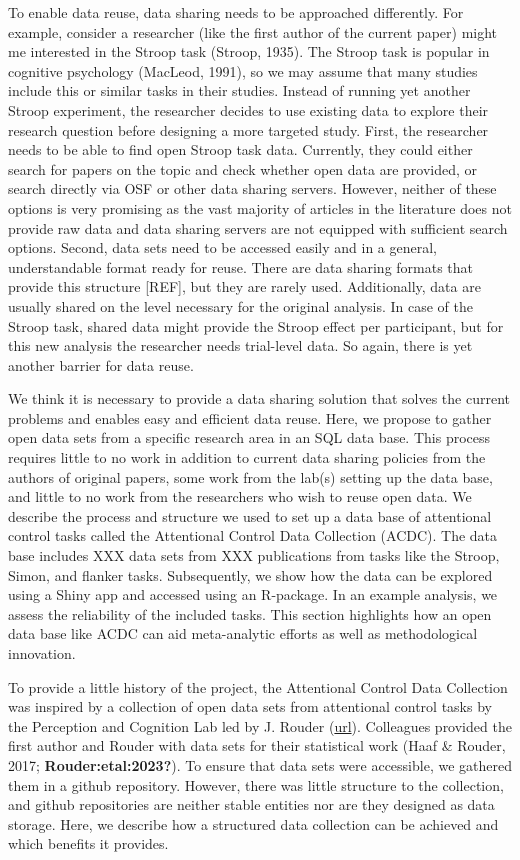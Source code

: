 \documentclass[
  man]{apa6}
\begin{document}
To enable data reuse, data sharing needs to be approached differently. For example, consider a researcher (like the first author of the current paper) might me interested in the Stroop task (Stroop, 1935). The Stroop task is popular in cognitive psychology (MacLeod, 1991), so we may assume that many studies include this or similar tasks in their studies. Instead of running yet another Stroop experiment, the researcher decides to use existing data to explore their research question before designing a more targeted study. First, the researcher needs to be able to find open Stroop task data. Currently, they could either search for papers on the topic and check whether open data are provided, or search directly via OSF or other data sharing servers. However, neither of these options is very promising as the vast majority of articles in the literature does not provide raw data and data sharing servers are not equipped with sufficient search options. Second, data sets need to be accessed easily and in a general, understandable format ready for reuse. There are data sharing formats that provide this structure {[}REF{]}, but they are rarely used. Additionally, data are usually shared on the level necessary for the original analysis. In case of the Stroop task, shared data might provide the Stroop effect per participant, but for this new analysis the researcher needs trial-level data. So again, there is yet another barrier for data reuse.

We think it is necessary to provide a data sharing solution that solves the current problems and enables easy and efficient data reuse. Here, we propose to gather open data sets from a specific research area in an SQL data base. This process requires little to no work in addition to current data sharing policies from the authors of original papers, some work from the lab(s) setting up the data base, and little to no work from the researchers who wish to reuse open data. We describe the process and structure we used to set up a data base of attentional control tasks called the Attentional Control Data Collection (ACDC). The data base includes XXX data sets from XXX publications from tasks like the Stroop, Simon, and flanker tasks. Subsequently, we show how the data can be explored using a Shiny app and accessed using an R-package. In an example analysis, we assess the reliability of the included tasks. This section highlights how an open data base like ACDC can aid meta-analytic efforts as well as methodological innovation.

To provide a little history of the project, the Attentional Control Data Collection was inspired by a collection of open data sets from attentional control tasks by the Perception and Cognition Lab led by J. Rouder (\href{https://github.com/PerceptionCognitionLab/data0}{url}). Colleagues provided the first author and Rouder with data sets for their statistical work (Haaf \& Rouder, 2017; \textbf{Rouder:etal:2023?}). To ensure that data sets were accessible, we gathered them in a github repository. However, there was little structure to the collection, and github repositories are neither stable entities nor are they designed as data storage. Here, we describe how a structured data collection can be achieved and which benefits it provides.
\end{document}
